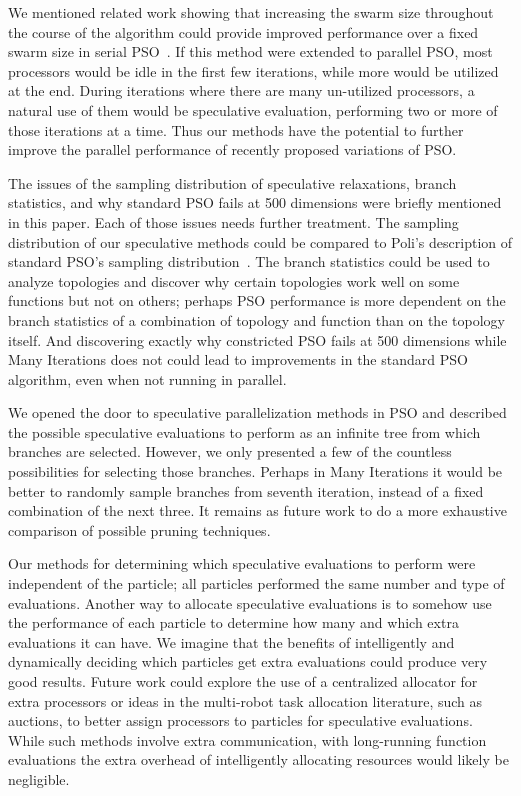 \documentclass[smallcondensed]{svjour3}
\begin{document}
We mentioned related work showing that increasing the swarm size throughout the
course of the algorithm could provide improved performance over a fixed swarm
size in serial PSO~\citep{montes-de-oca-2010-incremental-social-learning-pso}.
If this method were extended to parallel PSO, most processors would be idle in
the first few iterations, while more would be utilized at the end.  During
iterations where there are many un-utilized processors, a natural use of them
would be speculative evaluation, performing two or more of those iterations at
a time.  Thus our methods have the potential to further improve the parallel
performance of recently proposed variations of PSO.

The issues of the sampling distribution of speculative relaxations, branch
statistics, and why standard PSO fails at 500 dimensions were briefly mentioned
in this paper.  Each of those issues needs further treatment.  The sampling
distribution of our speculative methods could be compared to Poli's description
of standard PSO's sampling
distribution~\citep{poli-2008-sampling-distribution-of-pso}.  The branch
statistics could be used to analyze topologies and discover why certain
topologies work well on some functions but not on others; perhaps PSO
performance is more dependent on the branch statistics of a combination of
topology and function than on the topology itself.  And discovering exactly why
constricted PSO fails at 500 dimensions while Many Iterations does not could
lead to improvements in the standard PSO algorithm, even when not running in
parallel.

We opened the door to speculative parallelization methods in PSO and described
the possible speculative evaluations to perform as an infinite tree from which
branches are selected.  However, we only presented a few of the countless
possibilities for selecting those branches.  Perhaps in Many Iterations it
would be better to randomly sample branches from seventh iteration, instead
of a fixed combination of the next three.  It remains as future work to do a
more exhaustive comparison of possible pruning techniques.

Our methods for determining which speculative evaluations to perform were
independent of the particle; all particles performed the same number and type
of evaluations.  Another way to allocate speculative evaluations is to somehow
use the performance of each particle to determine how many and which extra
evaluations it can have.  We imagine that the benefits of intelligently and
dynamically deciding which particles get extra evaluations could produce very
good results.  Future work could explore the use of a centralized allocator for
extra processors or ideas in the multi-robot task allocation literature, such
as auctions, to better assign processors to particles for speculative
evaluations.  While such methods involve extra communication, with long-running
function evaluations the extra overhead of intelligently allocating resources
would likely be negligible.
\end{document}
